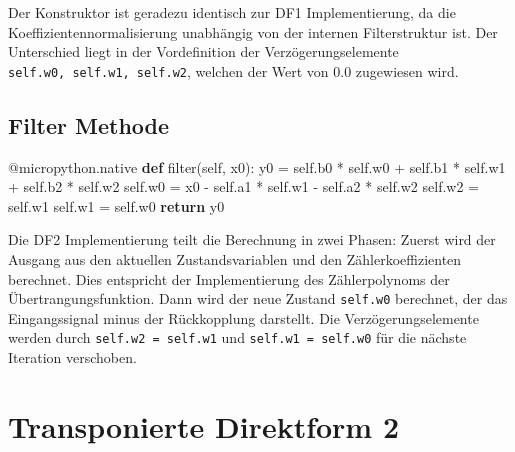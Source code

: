 \documentclass[
  ngerman,
  letterpaper,
  DIV=11]{scrreprt}
\newenvironment{Shaded}{\begin{snugshade}}{\end{snugshade}}
\newcommand{\AttributeTok}[1]{\textcolor[rgb]{0.40,0.45,0.13}{#1}}
\newcommand{\BuiltInTok}[1]{\textcolor[rgb]{0.00,0.23,0.31}{#1}}
\newcommand{\ControlFlowTok}[1]{\textcolor[rgb]{0.00,0.23,0.31}{\textbf{#1}}}
\newcommand{\KeywordTok}[1]{\textcolor[rgb]{0.00,0.23,0.31}{\textbf{#1}}}
\newcommand{\NormalTok}[1]{\textcolor[rgb]{0.00,0.23,0.31}{#1}}
\newcommand{\OperatorTok}[1]{\textcolor[rgb]{0.37,0.37,0.37}{#1}}
\newcommand{\VariableTok}[1]{\textcolor[rgb]{0.07,0.07,0.07}{#1}}
\begin{document}
Der Konstruktor ist geradezu identisch zur DF1 Implementierung, da die
Koeffizientennormalisierung unabhängig von der internen Filterstruktur
ist. Der Unterschied liegt in der Vordefinition der Verzögerungselemente
\texttt{self.w0,\ self.w1,\ self.w2}, welchen der Wert von 0.0
zugewiesen wird.

\subsection{Filter Methode}\label{filter-methode-4}

\begin{Shaded}
\begin{Highlighting}[]
    \AttributeTok{@micropython.native}
    \KeywordTok{def} \BuiltInTok{filter}\NormalTok{(}\VariableTok{self}\NormalTok{, x0):}
\NormalTok{        y0 }\OperatorTok{=} \VariableTok{self}\NormalTok{.b0 }\OperatorTok{*} \VariableTok{self}\NormalTok{.w0 }\OperatorTok{+} \VariableTok{self}\NormalTok{.b1 }\OperatorTok{*} \VariableTok{self}\NormalTok{.w1 }\OperatorTok{+} \VariableTok{self}\NormalTok{.b2 }\OperatorTok{*} \VariableTok{self}\NormalTok{.w2}
        \VariableTok{self}\NormalTok{.w0 }\OperatorTok{=}\NormalTok{ x0 }\OperatorTok{{-}} \VariableTok{self}\NormalTok{.a1 }\OperatorTok{*} \VariableTok{self}\NormalTok{.w1 }\OperatorTok{{-}} \VariableTok{self}\NormalTok{.a2 }\OperatorTok{*} \VariableTok{self}\NormalTok{.w2}
        \VariableTok{self}\NormalTok{.w2 }\OperatorTok{=} \VariableTok{self}\NormalTok{.w1}
        \VariableTok{self}\NormalTok{.w1 }\OperatorTok{=} \VariableTok{self}\NormalTok{.w0}
        \ControlFlowTok{return}\NormalTok{ y0}
\end{Highlighting}
\end{Shaded}

Die DF2 Implementierung teilt die Berechnung in zwei Phasen: Zuerst wird
der Ausgang aus den aktuellen Zustandsvariablen und den
Zählerkoeffizienten berechnet. Dies entspricht der Implementierung des
Zählerpolynoms der Übertrangungsfunktion. Dann wird der neue Zustand
\texttt{self.w0} berechnet, der das Eingangssignal minus der
Rückkopplung darstellt. Die Verzögerungselemente werden durch
\texttt{self.w2\ =\ self.w1} und \texttt{self.w1\ =\ self.w0} für die
nächste Iteration verschoben.

\section{Transponierte Direktform 2}\label{transponierte-direktform-2-1}
\end{document}
